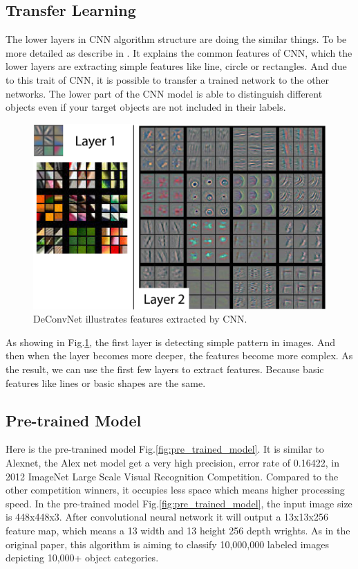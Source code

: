 \documentclass[senior]{IPSstyle}
\begin{document}
\subsection{Transfer Learning}\label{cha: transfer learning}
The lower layers in CNN algorithm structure are doing the similar things.
To be more detailed as describe in \cite{noh2015learning}.
It explains the common features of CNN, which the lower layers are extracting simple features like line, circle or rectangles.
And due to this trait of CNN, it is possible to transfer a trained network to the other networks.
The lower part of the CNN model is able to distinguish different objects even if your target objects are not included in their labels. 
\begin{figure}
    \centering
    \includegraphics[width=15cm]{MasterThesis-master/images/deconv.png}
    \caption{DeConvNet illustrates features extracted by CNN.}
    \label{fig:deconv}
\end{figure}

As showing in Fig.\ref{fig:deconv}, the first layer is detecting simple pattern in images.
And then when the layer becomes more deeper, the features become more complex.
As the result, we can use the first few layers to extract features.
Because basic features like lines or basic shapes are the same.


\subsection{Pre-trained Model}
Here is the pre-tranined model Fig.\ref{fig:pre_trained_model}.
It is similar to Alexnet\cite{krizhevsky2012imagenet}, the Alex net model get a very high precision, error rate of 0.16422, in 2012  ImageNet Large Scale Visual Recognition Competition.
Compared to the other competition winners, it occupies less space which means higher processing speed.
In the pre-trained model Fig.\ref{fig:pre_trained_model}, the input image size is 448x448x3.
After convolutional neural network it will output a 13x13x256 feature map, which means a 13 width and 13 height 256 depth wrights.
As in the original paper, this algorithm is aiming to classify 10,000,000 labeled images depicting 10,000+ object categories\cite{ILSVRC15}.
\end{document}
